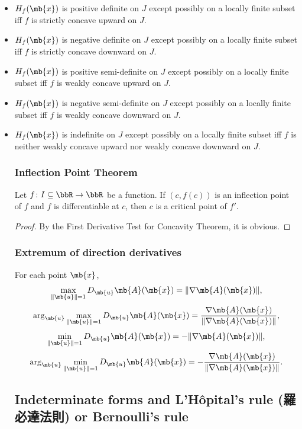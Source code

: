 \documentclass[a4paper,12pt]{report}
\begin{document}
\begin{itemize}
\begin{itemize}
\subsubsection{Concavity Test Theorem or Second Derivative Test for Concavity Theorem of multiple variables}
Let $f\colon I\subseteq\mathbb{R}^n\to\mathbb{R}$ be a function that is $C^1$ on an open convex set $J\subseteq I$, and $f$ is twice differentiable on $J$ except possibly on a locally finite subset, and $H_f$ is the Hessian of $f$.
\bit
\item $H_f(\mb{x})$ is positive definite on $J$ except possibly on a locally finite subset iff $f$ is strictly concave upward on $J$.
\item $H_f(\mb{x})$ is negative definite on $J$ except possibly on a locally finite subset iff $f$ is strictly concave downward on $J$.
\item $H_f(\mb{x})$ is positive semi-definite on $J$ except possibly on a locally finite subset iff $f$ is weakly concave upward on $J$.
\item $H_f(\mb{x})$ is negative semi-definite on $J$ except possibly on a locally finite subset iff $f$ is weakly concave downward on $J$.
\item $H_f(\mb{x})$ is indefinite on $J$ except possibly on a locally finite subset iff $f$ is neither weakly concave upward nor weakly concave downward on $J$.
\eit
\subsubsection{Inflection Point Theorem}
Let $f\colon I\subseteq\bbR\to\bbR$ be a function. If $(c,f(c))$ is an inflection point of $f$ and $f$ is differentiable at $c$, then $c$ is a critical point of $f'$.
\begin{proof}
By the First Derivative Test for Concavity Theorem, it is obvious.
\end{proof}
\subsubsection{Extremum of direction derivatives}
For each point $\mb{x}$,
\[\max_{\|\mb{u}\|=1}D_{\mb{u}}\mb{A}(\mb{x})=\|\nabla\mb{A}(\mb{x})\|,\]
\[\arg_{\mb{u}}\max_{\|\mb{u}\|=1}D_{\mb{u}}\mb{A}(\mb{x})=\frac{\nabla\mb{A}(\mb{x})}{\|\nabla\mb{A}(\mb{x})\|},\]
\[\min_{\|\mb{u}\|=1}D_{\mb{u}}\mb{A}(\mb{x})=-\|\nabla\mb{A}(\mb{x})\|,\]
\[\arg_{\mb{u}}\min_{\|\mb{u}\|=1}D_{\mb{u}}\mb{A}(\mb{x})=-\frac{\nabla\mb{A}(\mb{x})}{\|\nabla\mb{A}(\mb{x})\|}.\]
\subsection{Indeterminate forms and L'Hôpital's rule (羅必達法則) or Bernoulli's rule}

\end{itemize}
\end{itemize}
\end{document}
